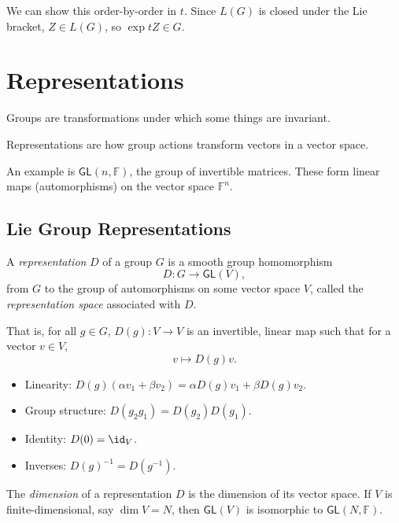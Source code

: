 \documentclass[12pt]{article}
\begin{document}
We can show this order-by-order in $t$.  Since $L(G)$ is closed under the Lie bracket, $Z \in L(G)$, so $\exp t Z \in G$.

\newpage

\section{Representations}%
\label{sec:rep}

Groups are transformations under which some things are invariant.

Representations are how group actions transform vectors in a vector space.

An example is $\mathsf{GL}(n, \mathbb{F})$, the group of invertible matrices. These form linear maps (automorphisms) on the vector space $\mathbb{F}^n$.

\subsection{Lie Group Representations}%
\label{sub:lie_rep}

\begin{definition}
	A \emph{representation} $D$ of a group $G$ is a smooth group homomorphism
	\[
	D : G \to \mathsf{GL}(V),
	\]
	from $G$ to the group of automorphisms on some vector space $V$, called the \emph{representation space} associated with $D$.

	That is, for all $g \in G$, $D(g) : V \to V$ is an invertible, linear map such that for a vector $v \in V$,
	\[
	v \mapsto D(g) v.
	\]
	\begin{itemize}
		\item Linearity: $D(g)(\alpha v_1 + \beta v_2) = \alpha D(g) v_1 + \beta D(g) v_2$.
		\item Group structure: $D(g_2 g_1) = D(g_2) D(g_1)$.
		\item Identity: $D(0) = \id_V$.
		\item Inverses: $D(g)^{-1} = D(g^{-1})$.
	\end{itemize}
\end{definition}

\begin{definition}
	The \emph{dimension} of a representation $D$ is the dimension of its vector space. If $V$ is finite-dimensional, say $\dim V = N$, then $\mathsf{GL}(V)$ is isomorphic to $\mathsf{GL}(N, \mathbb{F})$.
\end{definition}
\end{document}

